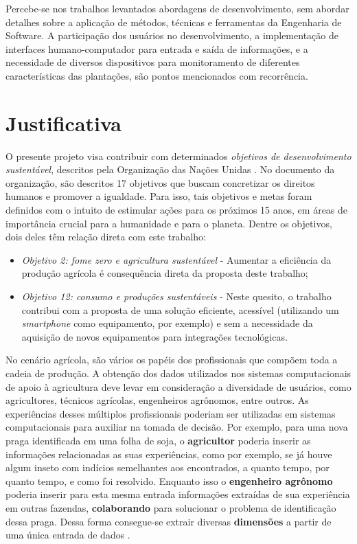 \documentclass[12pt]{article}
\begin{document}
Percebe-se nos trabalhos levantados abordagens de desenvolvimento, sem abordar detalhes sobre a aplicação de métodos, técnicas e ferramentas da Engenharia de Software. A participação dos usuários no desenvolvimento, a implementação de interfaces humano-computador para entrada e saída de informações, e a necessidade de diversos dispositivos para monitoramento de diferentes características das plantações, são pontos mencionados com recorrência.

\section{Justificativa}
\label{sec:justificativa}

O presente projeto visa contribuir com determinados \textit{objetivos de desenvolvimento sustentável}, descritos pela Organização das Nações Unidas \cite{ONU:2020}. No documento da organização, são descritos 17 objetivos que buscam concretizar os direitos humanos e promover a igualdade. Para isso, tais objetivos e metas foram definidos com o intuito de estimular ações para os próximos 15 anos, em áreas de importância crucial para a humanidade e para o planeta. Dentre os objetivos, dois deles têm relação direta com este trabalho:

\begin{itemize}
	\item \textit{Objetivo 2: fome zero e agricultura sustentável} - Aumentar a eficiência da produção agrícola é consequência direta da proposta deste trabalho;
	\item \textit{Objetivo 12: consumo e produções sustentáveis} - Neste quesito, o trabalho contribui com a proposta de uma solução eficiente, acessível (utilizando um \textit{smartphone} como equipamento, por exemplo) e sem a necessidade da aquisição de novos equipamentos para integrações tecnológicas.
\end{itemize}

No cenário agrícola, são vários os papéis dos profissionais que compõem toda a cadeia de produção. A obtenção dos dados utilizados nos sistemas computacionais de apoio à agricultura deve levar em consideração a diversidade de usuários, como agricultores, técnicos agrícolas, engenheiros agrônomos, entre outros. As experiências desses múltiplos profissionais poderiam ser utilizadas em sistemas computacionais para auxiliar na tomada de decisão. Por exemplo, para uma nova praga identificada em uma folha de soja, o \textbf{agricultor} poderia inserir as informações relacionadas as suas experiências, como por exemplo, se já houve algum inseto com indícios semelhantes aos encontrados, a quanto tempo, por quanto tempo, e como foi resolvido. Enquanto isso o \textbf{engenheiro agrônomo} poderia inserir para esta mesma entrada informações extraídas de sua experiência em outras fazendas, \textbf{colaborando} para solucionar o problema de identificação dessa praga. Dessa forma consegue-se extrair diversas \textbf{dimensões} a partir de uma única entrada de dados \cite{Walling:2020}.
\end{document}
